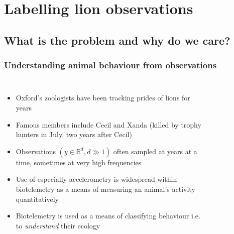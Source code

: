 \documentclass[aspectratio=169]{beamer}
\begin{document}
\section{Labelling lion observations}

\begin{frame}[plain]
    \subsection{What is the problem and why do we care?}
    \frametitle{Understanding animal behaviour from observations} 
    \begin{columns}[t] %


        \begin{itemize}
            \small
        \item Oxford's zoologists have been tracking prides of lions for years 
        \item Famous members include Cecil and Xanda (killed by trophy hunters in July, two years after Cecil)
        \item Observations $(y \in \mathbb{R}^d, d\gg1)$ often sampled at years at a time, sometimes at very high frequencies 
        \item Use of especially accelerometry is widespread within biotelemetry as a means of measuring an animal’s activity quantitatively
        \item Biotelemetry is used as a means of classifying behaviour i.e. to \emph{understand} their ecology
    \end{itemize}

    \vspace{-2em}
    \begin{figure}[ht]
        \\[-0em]
    \end{figure}
\end{columns}
    \end{frame}
\end{document}
